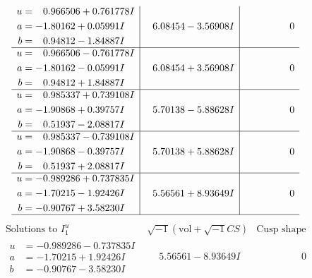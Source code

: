 \documentclass[1p]{elsarticle_modified}
\theoremstyle{definition}
\newcommand{\I}{\sqrt{-1}}
\begin{document}
$$\begin{array}{c|c|c}
\begin{aligned}
u &= \phantom{-}0.966506 + 0.761778 I \\
a &= -1.80162 + 0.05991 I \\
b &= \phantom{-}0.94812 - 1.84887 I\end{aligned}
 & \phantom{-}6.08454 - 3.56908 I & \phantom{-0.000000 } 0 \\ \hline\begin{aligned}
u &= \phantom{-}0.966506 - 0.761778 I \\
a &= -1.80162 - 0.05991 I \\
b &= \phantom{-}0.94812 + 1.84887 I\end{aligned}
 & \phantom{-}6.08454 + 3.56908 I & \phantom{-0.000000 } 0 \\ \hline\begin{aligned}
u &= \phantom{-}0.985337 + 0.739108 I \\
a &= -1.90868 + 0.39757 I \\
b &= \phantom{-}0.51937 - 2.08817 I\end{aligned}
 & \phantom{-}5.70138 - 5.88628 I & \phantom{-0.000000 } 0 \\ \hline\begin{aligned}
u &= \phantom{-}0.985337 - 0.739108 I \\
a &= -1.90868 - 0.39757 I \\
b &= \phantom{-}0.51937 + 2.08817 I\end{aligned}
 & \phantom{-}5.70138 + 5.88628 I & \phantom{-0.000000 } 0 \\ \hline\begin{aligned}
u &= -0.989286 + 0.737835 I \\
a &= -1.70215 - 1.92426 I \\
b &= -0.90767 + 3.58230 I\end{aligned}
 & \phantom{-}5.56561 + 8.93649 I & \phantom{-0.000000 } 0\\
 \hline 
 \end{array}$$\newpage$$\begin{array}{c|c|c}  
\text{Solutions to }I^u_{1}& \I (\text{vol} + \sqrt{-1}CS) & \text{Cusp shape}\\
 \hline 
\begin{aligned}
u &= -0.989286 - 0.737835 I \\
a &= -1.70215 + 1.92426 I \\
b &= -0.90767 - 3.58230 I\end{aligned}
 & \phantom{-}5.56561 - 8.93649 I & \phantom{-0.000000 } 0 \\ \hline\begin{aligned}

\end{aligned}
\end{array}$$
\end{document}
